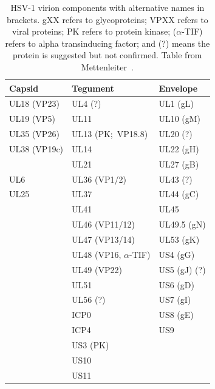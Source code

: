 \begin{table}[]
    \centering
    \caption[\gls{HSV}-1 virion components]{
    \gls{HSV}-1 virion components with alternative names in brackets.
    gXX refers to glycoproteins;
    VPXX refers to viral proteins;
    PK refers to protein kinase;
    (\(\alpha \)-TIF) refers to alpha transinducing factor;
    and (?) means the protein is suggested but not confirmed.
    Table from Mettenleiter~\cite{mettenleiterHerpesvirusAssemblyEgress2002}.
    }\label{tab:virus_proteins}
\begin{tabular}{lll}
    \toprule
Capsid       & Tegument           & Envelope     \\
\midrule
UL18 (VP23)  & UL4 (?)            & UL1 (gL)     \\
UL19 (VP5)   & UL11               & UL10 (gM)    \\
UL35 (VP26)  & UL13 (PK;~VP18.8)  & UL20 (?)     \\
UL38 (VP19c) & UL14               & UL22 (gH)    \\
             & UL21               & UL27 (gB)    \\
UL6          & UL36 (VP1/2)       & UL43 (?)     \\
UL25         & UL37               & UL44 (gC)    \\
             & UL41          & UL45         \\
             & UL46 (VP11/12)     & UL49.5 (gN)  \\
             & UL47 (VP13/14)     & UL53 (gK)    \\
             & UL48 (VP16, \(\alpha \)-TIF) & US4 (gG)     \\
             & UL49 (VP22)        & US5 (gJ) (?) \\
             & UL51               & US6 (gD)     \\
             & UL56 (?)           & US7 (gI)     \\
             & ICP0               & US8 (gE)     \\
             & ICP4               & US9          \\
             & US3 (PK)           &              \\
             & US10               &              \\
             & US11               &         \\
             \bottomrule
\end{tabular}
\end{table}


